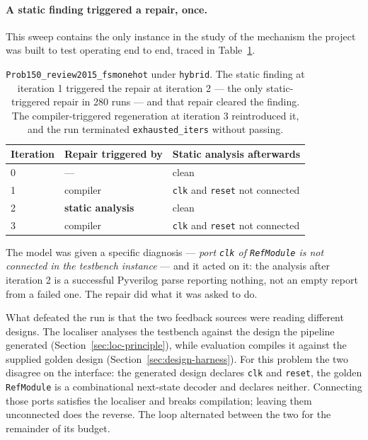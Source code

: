 \documentclass[11pt,a4paper,titlepage=false]{scrreprt}
\begin{document}
\paragraph{A static finding triggered a repair, once.} This sweep contains the only instance
in the study of the mechanism the project was built to test operating end to end, traced in
Table~\ref{tab:static-repair}.

\begin{table}[H]
\centering
\small
\begin{tabular}{@{}l l l@{}}
\toprule
\textbf{Iteration} & \textbf{Repair triggered by} & \textbf{Static analysis afterwards} \\
\midrule
0 & ---         & clean \\
1 & compiler    & \texttt{clk} and \texttt{reset} not connected \\
2 & \textbf{static analysis} & clean \\
3 & compiler    & \texttt{clk} and \texttt{reset} not connected \\
\bottomrule
\end{tabular}
\caption{\texttt{Prob150\_review2015\_fsmonehot} under \texttt{hybrid}. The static finding at
iteration 1 triggered the repair at iteration 2 --- the only static-triggered repair in 280
runs --- and that repair cleared the finding. The compiler-triggered regeneration at
iteration 3 reintroduced it, and the run terminated \texttt{exhausted\_iters} without
passing.}
\label{tab:static-repair}
\end{table}

The model was given a specific diagnosis --- \emph{port \texttt{clk} of \texttt{RefModule}
is not connected in the testbench instance} --- and it acted on it: the analysis after
iteration 2 is a successful Pyverilog parse reporting nothing, not an empty report from a
failed one. The repair did what it was asked to do.

What defeated the run is that the two feedback sources were reading different designs. The
localiser analyses the testbench against the design the pipeline generated
(Section~\ref{sec:loc-principle}), while evaluation compiles it against the supplied golden
design (Section~\ref{sec:design-harness}). For this problem the two disagree on the interface:
the generated design declares \texttt{clk} and \texttt{reset}, the golden
\texttt{RefModule} is a combinational next-state decoder and declares neither. Connecting
those ports satisfies the localiser and breaks compilation; leaving them unconnected does
the reverse. The loop alternated between the two for the remainder of its budget.
\end{document}
